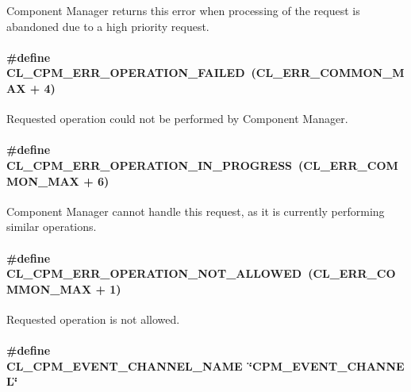 Component Manager returns this error when processing of the request is abandoned due to a high priority request. \hypertarget{group__group14_ga70}{
\paragraph[CL\_\-CPM\_\-ERR\_\-OPERATION\_\-FAILED]{\setlength{\rightskip}{0pt plus 5cm}\#define CL\_\-CPM\_\-ERR\_\-OPERATION\_\-FAILED~(CL\_\-ERR\_\-COMMON\_\-MAX + 4)}\hfill}
\label{group__group14_ga70}


Requested operation could not be performed by Component Manager. \hypertarget{group__group14_ga72}{
\paragraph[CL\_\-CPM\_\-ERR\_\-OPERATION\_\-IN\_\-PROGRESS]{\setlength{\rightskip}{0pt plus 5cm}\#define CL\_\-CPM\_\-ERR\_\-OPERATION\_\-IN\_\-PROGRESS~(CL\_\-ERR\_\-COMMON\_\-MAX + 6)}\hfill}
\label{group__group14_ga72}


Component Manager cannot handle this request, as it is currently performing similar operations. \hypertarget{group__group14_ga67}{
\paragraph[CL\_\-CPM\_\-ERR\_\-OPERATION\_\-NOT\_\-ALLOWED]{\setlength{\rightskip}{0pt plus 5cm}\#define CL\_\-CPM\_\-ERR\_\-OPERATION\_\-NOT\_\-ALLOWED~(CL\_\-ERR\_\-COMMON\_\-MAX + 1)}\hfill}
\label{group__group14_ga67}


Requested operation is not allowed. \hypertarget{group__group14_ga55}{
\paragraph[CL\_\-CPM\_\-EVENT\_\-CHANNEL\_\-NAME]{\setlength{\rightskip}{0pt plus 5cm}\#define CL\_\-CPM\_\-EVENT\_\-CHANNEL\_\-NAME~\char`\"{}CPM\_\-EVENT\_\-CHANNEL\char`\"{}}\hfill}
\label{group__group14_ga55}


